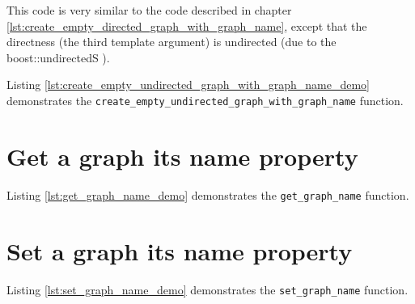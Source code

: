 

This code is very similar to the code described in chapter 
\ref{lst:create_empty_directed_graph_with_graph_name}, 
except that the directness (the third template argument) is undirected
(due to the boost::undirectedS ).

Listing \ref{lst:create_empty_undirected_graph_with_graph_name_demo}
demonstrates the \verb;create_empty_undirected_graph_with_graph_name; function.



\section{Get a graph its name property}
\label{subsec:get_graph_name}



Listing \ref{lst:get_graph_name_demo}
demonstrates the \verb;get_graph_name; function.



\section{Set a graph its name property}
\label{subsec:set_graph_name}



Listing \ref{lst:set_graph_name_demo}
 demonstrates the \verb;set_graph_name; function.



